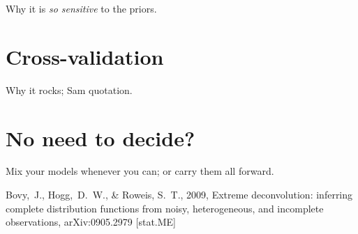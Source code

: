 \documentclass[12pt,twoside]{article}
\begin{document}
Why it is \emph{so sensitive} to the priors.

\section{Cross-validation}

Why it rocks; Sam quotation.

\section{No need to decide?}

Mix your models whenever you can; or carry them all forward.

\clearpage
{}\theendnotes

\clearpage
\begin{thebibliography}{}
  Bovy,~J., Hogg,~D.~W., \& Roweis, S.~T., 2009,
  Extreme deconvolution: inferring complete distribution functions from noisy, heterogeneous, and incomplete observations, 
  arXiv:0905.2979 [stat.ME]
\end{thebibliography}
\end{document}

